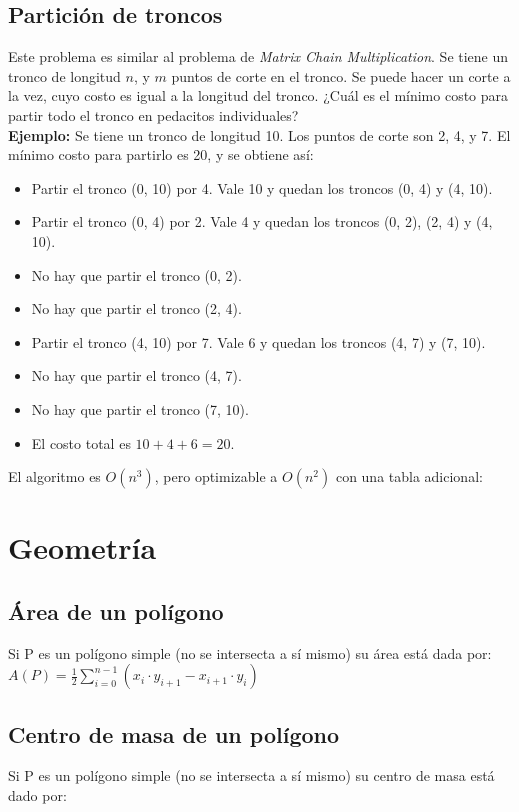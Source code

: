 \documentclass[10pt,letterpaper]{article}
\begin{document}
\subsection{Partición de troncos}
Este problema es similar al problema de \textit{Matrix Chain Multiplication}. Se tiene
un tronco de longitud $n$, y $m$ puntos de corte en el tronco. Se puede hacer un corte a la vez,
cuyo costo es igual a la longitud del tronco. ¿Cuál es el mínimo costo para partir todo el tronco
en pedacitos individuales?
\\
\medskip
\textbf{Ejemplo:} Se tiene un tronco de longitud 10. Los puntos de corte son 2, 4, y 7. El mínimo
costo para partirlo es 20, y se obtiene así:
\begin{itemize}
\item Partir el tronco (0, 10) por 4. Vale 10 y quedan los troncos (0, 4) y (4, 10).
\item Partir el tronco (0, 4) por 2. Vale 4 y quedan los troncos (0, 2), (2, 4) y (4, 10).
\item No hay que partir el tronco (0, 2).
\item No hay que partir el tronco (2, 4).
\item Partir el tronco (4, 10) por 7. Vale 6 y quedan los troncos (4, 7) y (7, 10).
\item No hay que partir el tronco (4, 7).
\item No hay que partir el tronco (7, 10).
\item El costo total es $10+4+6 = 20$.
\end{itemize}

\medskip
El algoritmo es $O(n^3)$, pero optimizable a $O(n^2)$ con una tabla adicional:

\section{Geometría}
\subsection{Área de un polígono}
Si P es un polígono simple (no se intersecta a sí mismo) su área está dada por: \\

$ A(P) = \frac{1}{2} \displaystyle\sum_{i=0}^{n-1} (x_{i} \cdot y_{i+1} - x_{i+1} \cdot y_{i}) $ \\
\bigskip

\subsection{Centro de masa de un polígono}
Si P es un polígono simple (no se intersecta a sí mismo) su centro de masa está dado por: \\
\end{document}
